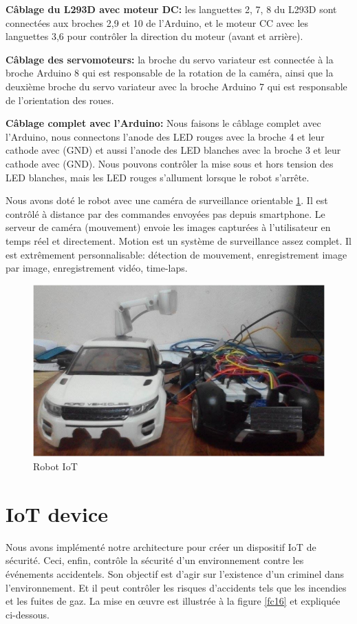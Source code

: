 \textbf{Câblage du L293D avec moteur DC: } les languettes 2, 7, 8 du L293D sont connectées aux broches 2,9 et 10 de l'Arduino, et le moteur CC avec les languettes 3,6 pour contrôler la direction du moteur (avant et arrière).


\textbf{Câblage des servomoteurs: } la broche du servo variateur est connectée à la broche Arduino 8 qui est responsable de la rotation de la caméra, ainsi que la deuxième broche du servo variateur avec la broche Arduino 7 qui est responsable de l'orientation des roues.


\textbf{Câblage complet avec l'Arduino:} Nous faisons le câblage complet avec l'Arduino, nous connectons l'anode des LED rouges avec la broche 4 et leur cathode avec (GND) et aussi l'anode des LED blanches avec la broche 3 et leur cathode avec (GND). Nous pouvons contrôler la mise sous et hors tension des LED blanches, mais les LED rouges s'allument lorsque le robot s'arrête.


 Nous avons doté le robot avec une caméra de surveillance orientable \ref{fccamera}. Il est contrôlé à distance par des commandes envoyées pas depuis smartphone. Le serveur de caméra (mouvement) envoie les images capturées à l'utilisateur en temps réel et directement. Motion est un système de surveillance assez complet. Il est extrêmement personnalisable: détection de mouvement, enregistrement image par image, enregistrement vidéo, time-laps.
\begin{figure}[H]
    \centering
    \includegraphics[scale=0.6]{chap1/fc24.png}
    \caption{Robot IoT}
    \label{fccamera}
\end{figure}

\section{IoT device}
Nous avons implémenté notre architecture pour créer un dispositif IoT de sécurité. Ceci, enfin, contrôle la sécurité d'un environnement contre les événements accidentels. Son objectif est d'agir sur l'existence d'un criminel dans l'environnement. Et il peut contrôler les risques d'accidents tels que les incendies et les fuites de gaz. La mise en œuvre est illustrée à la figure \ref{fc16} et expliquée ci-dessous.


